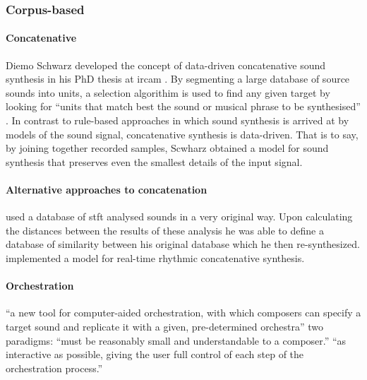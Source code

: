 \subsubsection{Corpus-based}
{



	\paragraph{Concatenative}

	Diemo Schwarz developed the concept of data-driven concatenative sound synthesis in his PhD thesis at \gls{ircam} \parencite{Schwarz2000, icmc/bbp2372.2003.099, Sch06:How}. By segmenting a large database of source sounds into units, a selection algorithim is used to find any given target by looking for ``units that match best the sound or musical phrase to be synthesised'' \parencite{Sch06:How}. In contrast to rule-based approaches in which sound synthesis is arrived at by models of the sound signal, concatenative synthesis is data-driven. That is to say, by joining together recorded samples, Scwharz obtained a model for sound synthesis that preserves even the smallest details of the input signal.

	\paragraph{Alternative approaches to concatenation}

	\citeauthor{icmc/bbp2372.2003.052} \parencite{icmc/bbp2372.2003.052} used a database of \gls{stft} analysed sounds in a very original way. Upon calculating the distances between the results of these analysis he was able to define a database of similarity between his original database which he then re-synthesized. \citeauthor{Nuannicode225in2016} \parencite{Nuannicode225in2016} implemented a model for real-time rhythmic concatenative synthesis. 

	\paragraph{Orchestration}
	``a new tool for computer-aided orchestration, with which composers can specify a target sound and replicate it with a given, pre-determined orchestra'' \parencite{gregoire_carpentier_2006_849343}
	two paradigms:
	``must be reasonably small and understandable to a composer.''
	``as interactive as possible, giving the user full control of each step of the orchestration process.''

}
